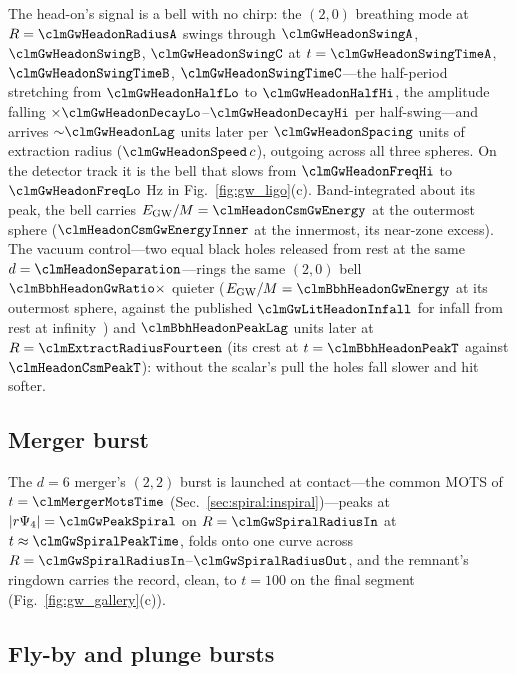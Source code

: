 \documentclass[twocolumn,floatfix,aps,prd,superscriptaddress,nofootinbib]{revtex4-2}
\begin{document}
The head-on's signal is a bell with no chirp: the $(2,0)$ breathing mode at $R=\clmGwHeadonRadiusA$ swings through $\clmGwHeadonSwingA$, $\clmGwHeadonSwingB$, $\clmGwHeadonSwingC$ at $t=\clmGwHeadonSwingTimeA$, $\clmGwHeadonSwingTimeB$, $\clmGwHeadonSwingTimeC$---the half-period stretching from $\clmGwHeadonHalfLo$ to $\clmGwHeadonHalfHi$, the amplitude falling $\times\clmGwHeadonDecayLo$--$\clmGwHeadonDecayHi$ per half-swing---and arrives ${\sim}\clmGwHeadonLag$ units later per $\clmGwHeadonSpacing$ units of extraction radius ($\clmGwHeadonSpeed\,c$), outgoing across all three spheres. On the detector track it is the bell that slows from $\clmGwHeadonFreqHi$ to $\clmGwHeadonFreqLo$ Hz in Fig.~\ref{fig:gw_ligo}(c). Band-integrated about its peak, the bell carries $E_{\rm GW}/M=\clmHeadonCsmGwEnergy$ at the outermost sphere ($\clmHeadonCsmGwEnergyInner$ at the innermost, its near-zone excess). The vacuum control---two equal black holes released from rest at the same $d=\clmHeadonSeparation$---rings the same $(2,0)$ bell $\clmBbhHeadonGwRatio\times$ quieter ($E_{\rm GW}/M=\clmBbhHeadonGwEnergy$ at its outermost sphere, against the published $\clmGwLitHeadonInfall$ for infall from rest at infinity~\cite{witek2010}) and $\clmBbhHeadonPeakLag$ units later at $R=\clmExtractRadiusFourteen$ (its crest at $t=\clmBbhHeadonPeakT$ against $\clmHeadonCsmPeakT$): without the scalar's pull the holes fall slower and hit softer.

\subsection{Merger burst}
\label{sec:spiral:burst}

The $d=6$ merger's $(2,2)$ burst is launched at contact---the common MOTS of $t=\clmMergerMotsTime$ (Sec.~\ref{sec:spiral:inspiral})---peaks at $|r\Psi_4|=\clmGwPeakSpiral$ on $R=\clmGwSpiralRadiusIn$ at $t\approx\clmGwSpiralPeakTime$, folds onto one curve across $R=\clmGwSpiralRadiusIn$--$\clmGwSpiralRadiusOut$, and the remnant's ringdown carries the record, clean, to $t=100$ on the final segment (Fig.~\ref{fig:gw_gallery}(c)).

\subsection{Fly-by and plunge bursts}
\label{sec:gw:flyby}
\end{document}
